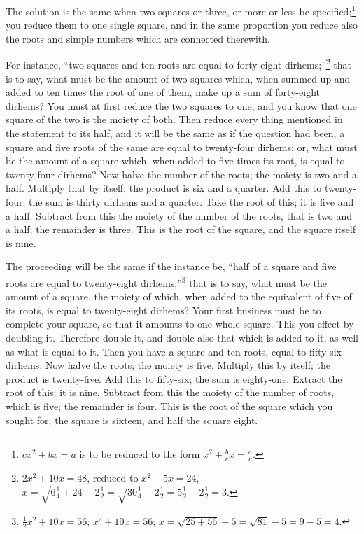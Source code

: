 The solution is the same when two squares or three, or more or less be specified;\footnote{$cx^2 + bx = a$ is to be reduced to the form $x^2 + \frac{b}{c}x = \frac{a}{c}$.} you reduce them to one single square, and in the same proportion you reduce also the roots and simple numbers which are connected therewith.

For instance, ``two squares and ten roots are equal to forty-eight dirhems;''\footnote{$2x^2 + 10x = 48$, reduced to $x^2 + 5x = 24$,\\$x = \sqrt{6\frac{1}{4} + 24} - 2\frac{1}{2} = \sqrt{30\frac{1}{4}} - 2\frac{1}{2} = 5\frac{1}{2} - 2\frac{1}{2} = 3$.} that is to say, what must be the amount of two squares which, when summed up and added to ten times the root of one of them, make up a sum of forty-eight dirhems? You must at first reduce the two squares to one; and you know that one square of the two is the moiety of both. Then reduce every thing mentioned in the statement to its half, and it will be the same as if the question had been, a square and five roots of the same are equal to twenty-four dirhems; or, what must be the amount of a square which, when added to five times its root, is equal to twenty-four dirhems? Now halve the number of the roots; the moiety is two and a half. Multiply that by itself; the product is six and a quarter. Add this to twenty-four; the sum is thirty dirhems and a quarter. Take the root of this; it is five and a half. Subtract from this the moiety of the number of the roots, that is two and a half; the remainder is three. This is the root of the square, and the square itself is nine.

The proceeding will be the same if the instance be, ``half of a square and five roots are equal to twenty-eight dirhems;''\footnote{$\frac{1}{2}x^2 + 10x = 56$; $x^2 + 10x = 56$; $x = \sqrt{25 + 56} - 5 = \sqrt{81} - 5 = 9 - 5 = 4$.} that is to say, what must be the amount of a square, the moiety of which, when added to the equivalent of five of its roots, is equal to twenty-eight dirhems? Your first business must be to complete your square, so that it amounts to one whole square. This you effect by doubling it. Therefore double it, and double also that which is added to it, as well as what is equal to it. Then you have a square and ten roots, equal to fifty-six dirhems. Now halve the roots; the moiety is five. Multiply this by itself; the product is twenty-five. Add this to fifty-six; the sum is eighty-one. Extract the root of this; it is nine. Subtract from this the moiety of the number of roots, which is five; the remainder is four. This is the root of the square which you sought for; the square is sixteen, and half the square eight.

